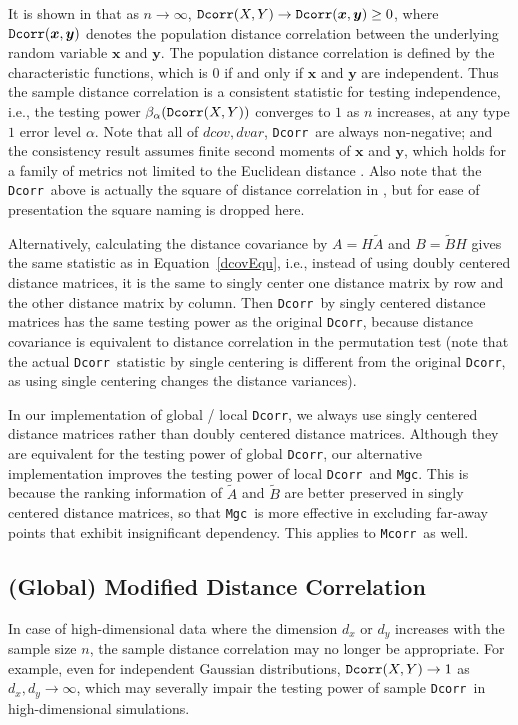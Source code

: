\documentclass[11pt]{article}
\providecommand{\sct}[1]{{\sc \texttt{#1}}}
\providecommand{\mb}[1]{\boldsymbol{#1}}
\newcommand{\Mgc}{\sct{Mgc}}
\newcommand{\Dcorr}{\sct{Dcorr}}
\newcommand{\Mcorr}{\sct{Mcorr}}
\begin{document}
It is shown in \cite{SzekelyRizzoBakirov2007} that as $n \rightarrow \infty$, $\Dcorr(X,Y) \rightarrow \Dcorr(\mb{x},\mb{y}) \geq 0$, where $\Dcorr(\mb{x},\mb{y})$ denotes the population distance correlation between the underlying random variable $\mb{x}$ and $\mb{y}$. The population distance correlation is defined by the characteristic functions, which is $0$ if and only if $\mb{x}$ and $\mb{y}$ are independent. Thus the sample distance correlation is a consistent statistic for testing independence, i.e., the testing power $\beta_{\alpha}(\Dcorr(X,Y))$
converges to $1$ as $n$ increases, at any type $1$ error level $\alpha$. Note that all of $dcov, dvar$, \Dcorr~are always non-negative; and the consistency result assumes finite second moments of $\mb{x}$ and $\mb{y}$, which holds for a family of metrics not limited to the Euclidean distance \cite{Lyons2013}. Also note that the \Dcorr~above is actually the square of distance correlation in \cite{SzekelyRizzoBakirov2007}, but for ease of presentation the square naming is dropped here.

Alternatively, calculating the distance covariance by $A=H\tilde{A}$ and $B=\tilde{B}H$ gives the same statistic as in Equation~\ref{dcovEqu}, i.e., instead of using doubly centered distance matrices, it is the same to singly center one distance matrix by row and the other distance matrix by column. Then \Dcorr~by singly centered distance matrices has the same testing power as the original \Dcorr, because distance covariance is equivalent to distance correlation in the permutation test (note that the actual \Dcorr~statistic by single centering is different from the original \Dcorr, as using single centering changes the distance variances).

In our implementation of global / local \Dcorr, we always use singly centered distance matrices rather than doubly centered distance matrices. Although they are equivalent for the testing power of global \Dcorr, our alternative implementation improves the testing power of local \Dcorr~and \Mgc. This is because the ranking information of $\tilde{A}$ and $\tilde{B}$ are better preserved in singly centered distance matrices, so that \Mgc~is more effective in excluding far-away points that exhibit insignificant dependency. This applies to \Mcorr~as well.

\subsection{(Global) Modified Distance Correlation}
\label{appen:mcorr}
In case of high-dimensional data where the dimension $d_{x}$ or $d_{y}$ increases with the sample size $n$, the sample distance correlation may no longer be appropriate. For example, even for independent Gaussian distributions, $\Dcorr(X,Y) \rightarrow 1$ as $d_{x}, d_{y} \rightarrow \infty$, which may severally impair the testing power of sample \Dcorr~in high-dimensional simulations.
\end{document}
